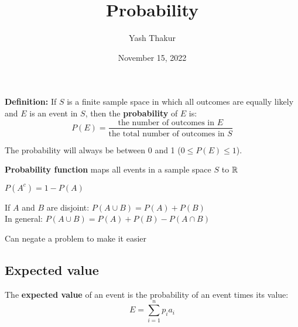 \documentclass[12pt, leqno]{article}
\title{Probability}
\author{Yash Thakur}
\date{November 15, 2022}
\begin{document}

\maketitle

\textbf{Definition:} If $S$ is a finite sample space in which all outcomes are equally likely and $E$ is an event in $S$, then the \textbf{probability} of $E$ is:
\[P(E) = \frac{\text{the number of outcomes in }E}{\text{the total number of outcomes in }S}\]

The probability will always be between 0 and 1 ($0 \leq P(E) \leq 1$).

\textbf{Probability function} maps all events in a sample space $S$ to $\mathbb R$

$P(A^c) = 1 - P(A)$

If $A$ and $B$ are disjoint: $P(A \cup B) = P(A) + P(B)$\\
In general: $P(A \cup B) = P(A) + P(B) - P(A \cap B)$

Can negate a problem to make it easier

\subsection*{Expected value}

The \textbf{expected value} of an event is the probability of an event times its value:
\[E = \sum_{i=1}^n p_i a_i\]
\end{document}
